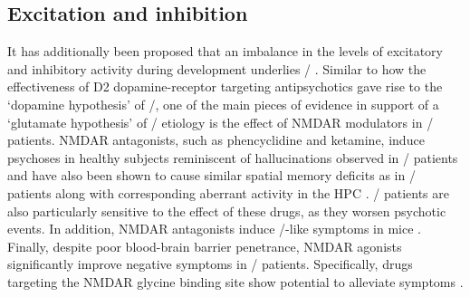 
\subsection{Excitation and inhibition}
\label{sec:intro:scz:glutamate}
It has additionally been proposed that an imbalance in the levels of excitatory and inhibitory activity during development underlies \scz/ \citep{Insel2010a, Coyle2006, Yizhar2011}.
Similar to how the effectiveness of D2 dopamine-receptor targeting antipsychotics gave rise to the `dopamine hypothesis' of \scz/, one of the main pieces of evidence in support of a `glutamate hypothesis' of \scz/ etiology is the effect of \ac{NMDAR} modulators in \scz/ patients.
\ac{NMDAR} antagonists, such as phencyclidine and ketamine, induce psychoses in healthy subjects reminiscent of hallucinations observed in \scz/ patients \citep{Javitt1991, Krystal1994} and have also been shown to cause similar spatial memory deficits as in \scz/ patients along with corresponding aberrant activity in the \ac{HPC} \citep{Morgan2014}.
\Scz/ patients are also particularly sensitive to the effect of these drugs, as they worsen psychotic events.
In addition, \ac{NMDAR} antagonists induce \scz/-like symptoms in mice \citep{Inta2010}.
Finally, despite poor blood-brain barrier penetrance, \ac{NMDAR} agonists significantly improve negative symptoms in \scz/ patients.
Specifically, drugs targeting the \ac{NMDAR} glycine binding site show potential to alleviate symptoms \citep{Tsai1998, Coyle2012}.

